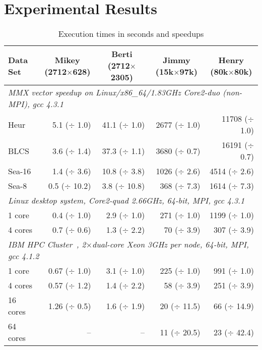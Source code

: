 \documentclass{IOS-Book-Article}     \usepackage{amsmath}
\theoremstyle{plain}
\theoremstyle{definition}
\begin{document}
\section{Experimental Results}\label{sec:expres}
\begin{table}[b]
\caption{Execution times in seconds and speedups}
\label{tbl:compresults}
\footnotesize
\begin{tabular*}{\textwidth}{l@{}rrrr}
\textbf{Data Set} & \multicolumn{1}{c}{\textbf{Mikey} (2712$\times$628)} &
\multicolumn{1}{c}{\textbf{Berti} (2712$\times$2305)} &
\multicolumn{1}{c}{\textbf{Jimmy} (15k$\times$97k)} &
\multicolumn{1}{c}{\textbf{Henry} (80k$\times$80k)}\\ 
\hline
\hline
\multicolumn{5}{l}{\textit{MMX vector speedup on Linux/x86\_64/1.83GHz
Core2-duo (non-MPI), gcc 4.3.1}}\\
\hline
{Heur} &5.1 ($\div$ 1.0)  &41.1 ($\div$ 1.0) &2677 ($\div$ 1.0)
&11708 ($\div$ 1.0) \\
{BLCS} &3.6 ($\div$ 1.4)  &37.3 ($\div$ 1.1) &3680 ($\div$ 0.7)
&16191 ($\div$ 0.7) \\
{Sea-16} &1.4 ($\div$ 3.6)  &10.8 ($\div$ 3.8) &1026 ($\div$ 2.6)
&4514 ($\div$ 2.6) \\
{Sea-8}  &0.5 ($\div$ 10.2) 	&3.8 ($\div$ 10.8) & 368 ($\div$ 7.3)
&1614 ($\div$ 7.3) \\
\hline
\multicolumn{5}{l}{\textit{Linux desktop system, Core2-quad 2.66GHz, 64-bit,
MPI, gcc 4.3.1}}\\
\hline
1 core  & 0.4 ($\div$ 1.0) & 2.9 ($\div$ 1.0)  & 271 ($\div$ 1.0) & 1199 ($\div$ 1.0) \\ 
4 cores & 0.7 ($\div$ 0.6) & 1.3 ($\div$ 2.2) & 70 ($\div$ 3.9) & 307 ($\div$ 3.9)  \\
\hline
\multicolumn{5}{l}{\textit{IBM HPC Cluster~\cite{website_csc_facilities},
2$\times$dual-core Xeon 3GHz per node, 64-bit, MPI, gcc 4.1.2}}\\
\hline
1 core  & 0.67 ($\div$ 1.0)  & 3.1 ($\div$ 1.0) &225 ($\div$ 1.0)  & 991 ($\div$ 1.0)  \\
4 cores  & 0.57 ($\div$ 1.2)  & 1.4 ($\div$ 2.2) & 58 ($\div$ 3.9)  & 251 ($\div$ 3.9)  \\
16 cores & 1.26 ($\div$ 0.5)  & 1.6 ($\div$ 1.9) & 20 ($\div$ 11.5) & 66 ($\div$ 14.9) \\
64 cores & --           & --         & 11  ($\div$ 20.5)  & 23 ($\div$ 42.4) \\
\hline
\end{tabular*}
\end{table}
\end{document}
